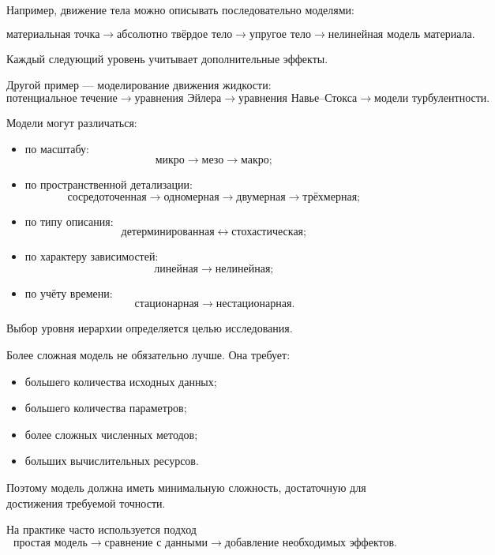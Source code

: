 Например, движение тела можно описывать последовательно моделями:

\[
\boxed{\text{материальная точка}}
\rightarrow
\boxed{\text{абсолютно твёрдое тело}}
\rightarrow
\boxed{\text{упругое тело}}
\rightarrow
\boxed{\text{нелинейная модель материала}}.
\]

Каждый следующий уровень учитывает дополнительные эффекты.

Другой пример --- моделирование движения жидкости:
\[
\text{потенциальное течение}
\rightarrow
\text{уравнения Эйлера}
\rightarrow
\text{уравнения Навье--Стокса}
\rightarrow
\text{модели турбулентности}.
\]

Модели могут различаться:

\begin{itemize}
	\item по масштабу:
	\[
	\text{микро} \rightarrow \text{мезо} \rightarrow \text{макро};
	\]
	
	\item по пространственной детализации:
	\[
	\text{сосредоточенная}
	\rightarrow
	\text{одномерная}
	\rightarrow
	\text{двумерная}
	\rightarrow
	\text{трёхмерная};
	\]
	
	\item по типу описания:
	\[
	\text{детерминированная}
	\leftrightarrow
	\text{стохастическая};
	\]
	
	\item по характеру зависимостей:
	\[
	\text{линейная}
	\rightarrow
	\text{нелинейная};
	\]
	
	\item по учёту времени:
	\[
	\text{стационарная}
	\rightarrow
	\text{нестационарная}.
	\]
\end{itemize}

Выбор уровня иерархии определяется целью исследования.

Более сложная модель не обязательно лучше. Она требует:
\begin{itemize}
	\item большего количества исходных данных;
	\item большего количества параметров;
	\item более сложных численных методов;
	\item больших вычислительных ресурсов.
\end{itemize}

Поэтому модель должна иметь минимальную сложность, достаточную
для достижения требуемой точности.

На практике часто используется подход
\[
\text{простая модель}
\rightarrow
\text{сравнение с данными}
\rightarrow
\text{добавление необходимых эффектов}.
\]


